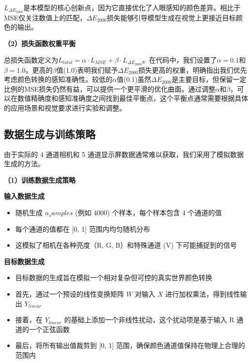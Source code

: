 $L_{\Delta E_{2000}}$是本模型的核心创新点，因为它直接优化了人眼感知的颜色差异。相比于MSE仅关注数值上的匹配，$\Delta E_{2000}$损失能够引导模型生成在视觉上更接近目标颜色的输出。

\noindent\textbf{（2）损失函数权重平衡}

总损失函数定义为$ L_{total} = \alpha \cdot L_{MSE} + \beta \cdot L_{\Delta E_{2000}} $。在代码中，我们设置了$\alpha=0.1$和$\beta=1.0$。更高的$\beta$值(1.0)表明我们赋予$\Delta E_{2000}$损失更高的权重，明确指出我们优先考虑颜色转换的感知准确性。较低的$\alpha$值(0.1)虽然$\Delta E_{2000}$是主要目标，但保留一定比例的MSE损失仍然有益，可以提供一个更平滑的优化曲面。通过调整$\alpha$和$\beta$，可以在数值精确度和感知准确度之间找到最佳平衡点，这个平衡点通常需要根据具体的应用场景和视觉要求进行实验和调整。

\subsection[\hspace{-2pt}数据生成与训练策略]{{\heiti{} \hspace{-8pt}数据生成与训练策略}}\label{section2: 数据生成与训练策略}

由于实际的 4 通道相机和 5 通道显示屏数据通常难以获取，我们采用了模拟数据生成的方法。

\noindent\textbf{（1）训练数据生成策略}

 \textbf{输入数据生成}
\begin{itemize}
    \item 随机生成 $n_samples$ (例如 4000) 个样本，每个样本包含 4 个通道的值
    \item 每个通道的值都在 [0, 1] 范围内均匀随机分布
    \item 这模拟了相机在各种亮度（R, G, B）和特殊通道 (V) 下可能捕捉到的信号
\end{itemize}

 \textbf{目标数据生成}
\begin{itemize}
    \item 目标数据的生成旨在模拟一个相对复杂但可控的真实世界颜色转换
    \item 首先，通过一个预设的线性变换矩阵 $W$ 对输入 $X$ 进行加权乘法，得到线性输出 $Y_{linear}$
    \item 接着，在 $Y_{linear}$ 的基础上添加一个非线性扰动，这个扰动项是基于输入 R 通道的一个正弦函数
    \item 最后，将所有输出值裁剪到 [0, 1] 范围，确保颜色通道值保持在物理上合理的范围内
\end{itemize}

